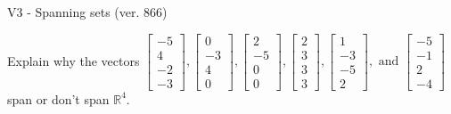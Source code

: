 \begin{exercise}
  \begin{exerciseTitle}V3 - Spanning sets (ver. 866)\end{exerciseTitle}
  \begin{exerciseStatement}
    Explain why the vectors \(\left[\begin{array}{r}
-5 \\
4 \\
-2 \\
-3
\end{array}\right] , \left[\begin{array}{r}
0 \\
-3 \\
4 \\
0
\end{array}\right] , \left[\begin{array}{r}
2 \\
-5 \\
0 \\
0
\end{array}\right] , \left[\begin{array}{r}
2 \\
3 \\
3 \\
3
\end{array}\right] , \left[\begin{array}{r}
1 \\
-3 \\
-5 \\
2
\end{array}\right] , \text{ and } \left[\begin{array}{r}
-5 \\
-1 \\
2 \\
-4
\end{array}\right]\) span or don't span \(\mathbb{R}^4\). 
	



\end{exerciseStatement}
\end{exercise}
